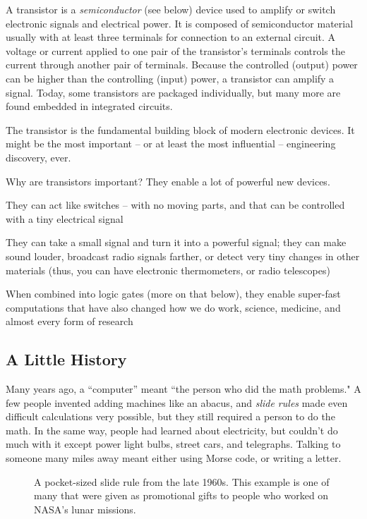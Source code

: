 A transistor is a \emph{semiconductor} (see below) device used to amplify or switch electronic signals and electrical power. It is composed of semiconductor material usually with at least three terminals for connection to an external circuit. A voltage or current applied to one pair of the transistor's terminals controls the current through another pair of terminals. Because the controlled (output) power can be higher than the controlling (input) power, a transistor can amplify a signal. Today, some transistors are packaged individually, but many more are found embedded in integrated circuits.

The transistor is the fundamental building block of modern electronic devices. It might be the most important -- or at least the most influential -- engineering discovery, ever.

Why are transistors important? They enable a lot of powerful new devices. 

\bi

\+ They can act like switches -- with no moving parts, and that can be controlled with a tiny electrical signal

\+ They can take a small signal and turn it into a powerful signal; they can make sound louder, broadcast radio signals farther, or detect very tiny changes in other materials (thus, you can have electronic thermometers, or radio telescopes)

\+ When combined into logic gates (more on that below), they enable super-fast computations that have also changed how we do work, science, medicine, and almost every form of research

\ei

\subsection*{A Little History}

Many years ago, a ``computer'' meant ``the person who did the math problems." A few people invented adding machines like an abacus, and \emph{slide rules} made even difficult calculations very possible, but they still required a person to do the math. In the same way, people had learned about electricity, but couldn't do much with it except power light bulbs, street cars, and telegraphs. Talking to someone many miles away meant either using Morse code, or writing a letter. 

\begin{figure}[h!]
\begin{center}
\end{center}
\caption{A pocket-sized slide rule from the late 1960s. This example is one of many that were given as promotional gifts to people who worked on NASA's lunar missions.}
\label{fig:sliderule}
\end{figure}

